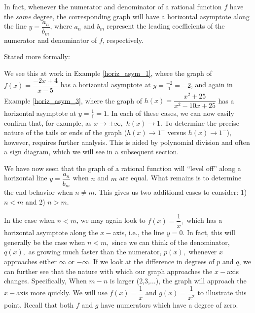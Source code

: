 \documentclass[12pt]{book}
\theoremstyle{definition}
\begin{document}
In fact, whenever the numerator and denominator of a rational function $f$ have the {\it same} degree, the corresponding graph will have a horizontal asymptote along the line $y=\dfrac{a_n}{b_m}$, where $a_n$ and $b_m$ represent the leading coefficients of the numerator and denominator of $f$, respectively.
\par
Stated more formally:
\begin{center}
\end{center}
We see this at work in Example \ref{horiz_asym_1}, where the graph of $f(x)=\dfrac{-2x+4}{x-5}$ has a horizontal asymptote at $y=\frac{-2}{1}=-2$, and again in Example \ref{horiz_asym_3}, where the graph of $h(x)=\dfrac{x^2+25}{x^2-10x+25}$
has a horizontal asymptote at $y=\frac{1}{1}=1$.  In each of these cases, we can now easily confirm that, for example, as $x\rightarrow\pm\infty,$ $h(x)\rightarrow 1$.  To determine the precise nature of the tails or ends of the graph ($h(x)\rightarrow 1^+$ versus $h(x)\rightarrow 1^-$), however, requires further analysis.  This is aided by polynomial division and often a sign diagram, which we will see in a subsequent section.
\par 
We have now seen that the graph of a rational function will ``level off'' along a horizontal line $y=\dfrac{a_n}{b_m}$ when $n$ and $m$ are equal.  What remains is to determine the end behavior when $n\neq m$.  This gives us two additional cases to consider: 1) $n<m$ and 2) $n>m$.  \par
In the case when $n<m$, we may again look to $f(x)=\dfrac{1}{x},$ which has a horizontal asymptote along the $x-$axis, i.e., the line $y=0$.  In fact, this will generally be the case when $n<m,$ since we can think of the denominator, $q(x),$ as growing much faster than the numerator, $p(x),$ whenever $x$ approaches either $\infty$ or $-\infty$.  If we look at the difference in degrees of $p$ and $q$, we can further see that the nature with which our graph approaches the $x-$axis changes.  Specifically, When $m-n$ is larger (2,3,$\ldots$), the graph will approach the $x-$axis more quickly.  We will use $f(x)=\dfrac{1}{x}$ and $g(x)=\dfrac{1}{x^2}$ to illustrate this point.  Recall that both $f$ and $g$ have numerators which have a degree of zero.
\end{document}
